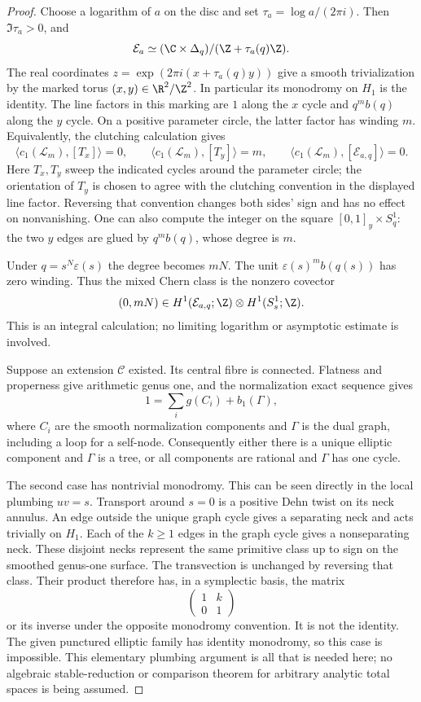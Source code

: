 \begin{proof}
Choose a logarithm of $a$ on the disc and set
$\tau_a=\log a/(2\pi i)$.  Then $\Im\tau_a>0$, and
\[
 \mathcal E_a\simeq
 (\C\times\Delta_q)/(\Z+\tau_a(q)\Z).
\]
The real coordinates $z=\exp(2\pi i(x+\tau_a(q)y))$
give a smooth trivialization by the marked torus
$(x,y)\in\R^2/\Z^2$.  In particular its monodromy on
$H_1$ is the identity.  The line factors in this marking
are $1$ along the $x$ cycle and $q^m b(q)$ along the
$y$ cycle.  On a positive parameter circle, the latter
factor has winding $m$.  Equivalently, the clutching
calculation gives
\[
 \langle c_1(\mathcal L_m),[T_x]\rangle=0,
 \qquad
 \langle c_1(\mathcal L_m),[T_y]\rangle=m,
 \qquad
 \langle c_1(\mathcal L_m),[\mathcal E_{a,q}]\rangle=0.
\]
Here $T_x,T_y$ sweep the indicated cycles around the
parameter circle; the orientation of $T_y$ is chosen to
agree with the clutching convention in the displayed
line factor.  Reversing that convention changes both
sides' sign and has no effect on nonvanishing.  One can
also compute the integer on the square
$[0,1]_y\times S^1_q$: the two $y$ edges are glued by
$q^m b(q)$, whose degree is $m$.

Under $q=s^N\varepsilon(s)$ the degree becomes $mN$.
The unit $\varepsilon(s)^m b(q(s))$ has zero winding.
Thus the mixed Chern class is the nonzero covector
\[
  (0,mN)\in
 H^1(\mathcal E_{a,q};\Z)\otimes H^1(S_s^1;\Z).
\]
This is an integral calculation; no limiting logarithm
or asymptotic estimate is involved.

Suppose an extension $\mathcal C$ existed.  Its central
fibre is connected.  Flatness and properness give arithmetic
genus one, and the normalization exact sequence gives
\[
 1=\sum_i g(C_i)+b_1(\Gamma),
\]
where $C_i$ are the smooth normalization components and
$\Gamma$ is the dual graph, including a loop for a
self-node.  Consequently either there is a unique
elliptic component and $\Gamma$ is a tree, or all
components are rational and $\Gamma$ has one cycle.

The second case has nontrivial monodromy.  This can be
seen directly in the local plumbing $uv=s$.  Transport
around $s=0$ is a positive Dehn twist on its neck annulus.
An edge outside the unique graph cycle gives a separating
neck and acts trivially on $H_1$.  Each of the $k\ge1$
edges in the graph cycle gives a nonseparating neck.
These disjoint necks represent the same primitive class
up to sign on the smoothed genus-one surface.  The
transvection is unchanged by reversing that class.
Their product therefore has, in a symplectic basis, the
matrix
\[
  \begin{pmatrix}1&k\\0&1\end{pmatrix}
\]
or its inverse under the opposite monodromy convention.
It is not the identity.  The given punctured elliptic
family has identity monodromy, so this case is impossible.
This elementary plumbing argument is all that is needed
here; no algebraic stable-reduction or comparison theorem
for arbitrary analytic total spaces is being assumed.


\end{proof}
